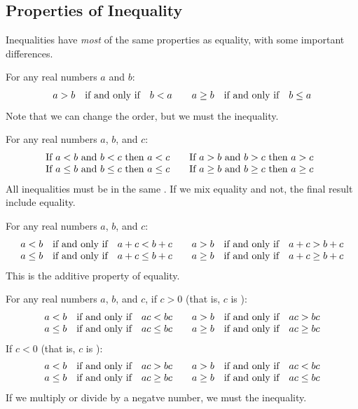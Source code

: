 \subsection{Properties of Inequality} 
Inequalities have \emph{most} of the same properties as equality, with some important differences.
\begin{displaybox}
For any real numbers $a$ and $b$:
\[
\begin{array}{c@{\quad\mbox{if and only if}\quad}c@{\qquad}c@{\quad\mbox{if and only if}\quad}c}
a>b&b<a&
a\geq b&b\leq a
\end{array}
\]
Note that we can change the order, but we must \makeblank[1in] the inequality.
\end{displaybox}
\begin{displaybox}
For any real numbers $a$, $b$, and $c$:
\[
\begin{array}{@{\mbox{If }}c@{\mbox{ and }}c@{\mbox{ then }}c@{\qquad}@{\mbox{If }}c@{\mbox{ and }}c@{\mbox{ then }}c}
a<b&b<c&a<c&
a>b&b>c&a>c\\
a\leq b&b\leq c&a\leq c&
a\geq b&b\geq c&a\geq c\\
\end{array}
\]
All inequalities must be in the same \makeblank[1.5in]. If we mix equality and not, the final result \makeblank[1in] include equality.
\end{displaybox}
\begin{displaybox}
For any real numbers $a$, $b$, and $c$:
\[
\begin{array}{c@{\quad\mbox{if and only if}\quad}c@{\qquad}c@{\quad\mbox{if and only if}\quad}c}
a<b&a+c<b+c&
a>b&a+c>b+c\\
a\leq b&a+c\leq b+c&
a\geq b&a+c\geq b+c
\end{array}
\]
This is \makeblank the additive property of equality.
\end{displaybox}
\begin{displaybox}
For any real numbers $a$, $b$, and $c$, if $c>0$ (that is, $c$ is \makeblank[1in]):
\[
\begin{array}{c@{\quad\mbox{if and only if}\quad}c@{\qquad}c@{\quad\mbox{if and only if}\quad}c}
a<b&ac<bc&
a>b&ac>bc\\
a\leq b&ac\leq bc&
a\geq b&ac\geq bc
\end{array}
\]
If $c<0$ (that is, $c$ is \makeblank[1in]):
\[
\begin{array}{c@{\quad\mbox{if and only if}\quad}c@{\qquad}c@{\quad\mbox{if and only if}\quad}c}
a<b&ac>bc&
a>b&ac<bc\\
a\leq b&ac\geq bc&
a\geq b&ac\leq bc
\end{array}
\]
If we multiply or divide by a negatve number, we must \makeblank[1.5in] the inequality.
\end{displaybox}